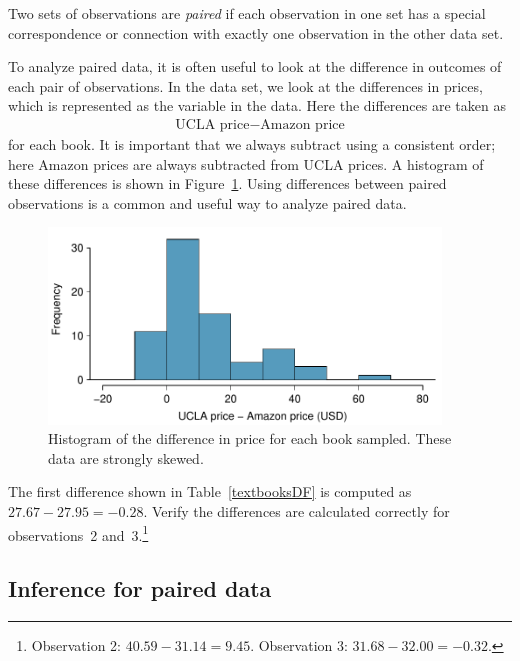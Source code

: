\begin{termBox}{
Two sets of observations are \emph{paired} if each observation in one set has a special correspondence or connection with exactly one observation in the other data set.}
\end{termBox}

To analyze paired data, it is often useful to look at the difference in outcomes of each pair of observations. In the  data set, we look at the differences in prices, which is represented as the  variable in the  data. Here the differences are taken as
\begin{eqnarray*}
\text{UCLA price} - \text{Amazon price}
\end{eqnarray*}
for each book. It is important that we always subtract using a consistent order; here Amazon prices are always subtracted from UCLA prices. A histogram of these differences is shown in Figure~\ref{diffInTextbookPricesS10}. Using differences between paired observations is a common and useful way to analyze paired data.

\begin{figure}
\centering
\includegraphics[width=0.93\textwidth]{ch_inference_for_means/figures/textbooksS10/diffInTextbookPricesS10}
\caption{Histogram of the difference in price for each book sampled. These data are strongly skewed.}
\label{diffInTextbookPricesS10}
\end{figure}

\begin{exercise}
The first difference shown in Table~\ref{textbooksDF} is computed as $27.67-27.95=-0.28$. Verify the differences are calculated correctly for observations~2 and~3.\footnote{Observation 2: $40.59 - 31.14 = 9.45$. Observation 3: $31.68 - 32.00 = -0.32$.}
\end{exercise}


\subsection{Inference for paired data}

